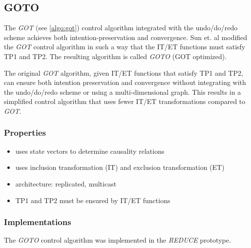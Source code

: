 \subsection{GOTO}
\label{algo:goto}

The \emph{GOT} (see \ref{algo:got}) control algorithm integrated with the undo/do/redo scheme achieves both intention-preservation and convergence. Sun et. al \cite{sun98b} modified the \emph{GOT} control algorithm in such a way that the IT/ET functions must satisfy TP1 and TP2. The resulting algorithm is called \emph{GOTO} (GOT optimized).

The original \emph{GOT} algorithm, given IT/ET functions that satisfy TP1 and TP2, can ensure both intention preservation and convergence without integrating with the undo/do/redo scheme or using a multi-dimensional graph. This results in a simplified control algorithm that uses fewer IT/ET transformations compared to \emph{GOT}.


\subsubsection{Properties}
\begin{itemize}
 \item uses state vectors to determine causality relations
 \item uses inclusion transformation (IT) and exclusion transformation (ET)
 \item architecture: replicated, multicast
 \item TP1 and TP2 must be ensured by IT/ET functions
\end{itemize}


\subsubsection{Implementations}
The \emph{GOTO} control algorithm was implemented in the \emph{REDUCE} prototype. 
